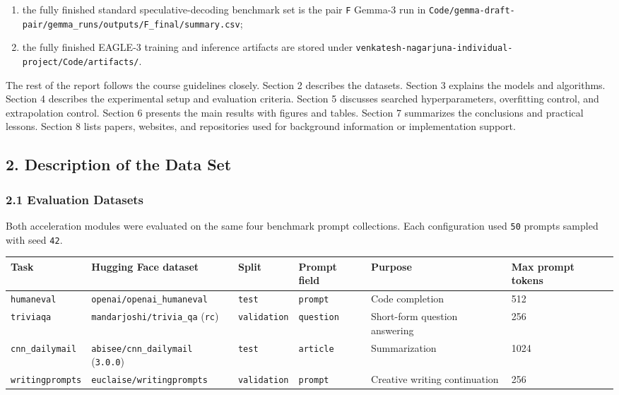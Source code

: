 \documentclass[
]{article}
\newcounter{none} %
\begin{document}
\begin{enumerate}
\def\labelenumi{\arabic{enumi}.}
\item
  the fully finished standard speculative-decoding benchmark set is the
  pair \texttt{F} Gemma-3 run in
  \texttt{Code/gemma-draft-pair/gemma\_runs/outputs/F\_final/summary.csv};
\item
  the fully finished EAGLE-3 training and inference artifacts are stored
  under \texttt{venkatesh-nagarjuna-individual-project/Code/artifacts/}.
\end{enumerate}

The rest of the report follows the course guidelines closely. Section 2
describes the datasets. Section 3 explains the models and algorithms.
Section 4 describes the experimental setup and evaluation criteria.
Section 5 discusses searched hyperparameters, overfitting control, and
extrapolation control. Section 6 presents the main results with figures
and tables. Section 7 summarizes the conclusions and practical lessons.
Section 8 lists papers, websites, and repositories used for background
information or implementation support.

\subsection{2. Description of the Data
Set}\label{2-description-of-the-data-set}

\subsubsection{2.1 Evaluation Datasets}\label{21-evaluation-datasets}

Both acceleration modules were evaluated on the same four benchmark
prompt collections. Each configuration used \texttt{50} prompts sampled
with seed \texttt{42}.

{\def\LTcaptype{none} %
\begin{longtable}[]{@{}llllll@{}}
\toprule\noalign{}
Task & Hugging Face dataset & Split & Prompt field & Purpose & Max
prompt tokens \\
\midrule\noalign{}
\endhead
\bottomrule\noalign{}
\endlastfoot
\texttt{humaneval} & \texttt{openai/openai\_humaneval} & \texttt{test} &
\texttt{prompt} & Code completion & 512 \\
\texttt{triviaqa} & \texttt{mandarjoshi/trivia\_qa} (\texttt{rc}) &
\texttt{validation} & \texttt{question} & Short-form question answering
& 256 \\
\texttt{cnn\_dailymail} & \texttt{abisee/cnn\_dailymail}
(\texttt{3.0.0}) & \texttt{test} & \texttt{article} & Summarization &
1024 \\
\texttt{writingprompts} & \texttt{euclaise/writingprompts} &
\texttt{validation} & \texttt{prompt} & Creative writing continuation &
256 \\
\end{longtable}
}
\end{document}
